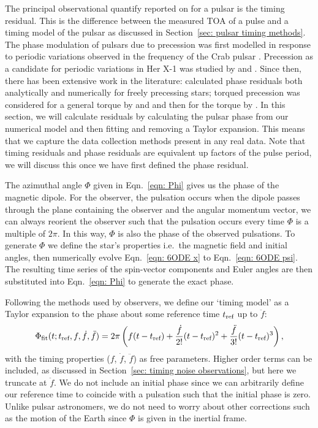 \documentclass[../full_thesis/full_thesis.tex]{subfiles}
\begin{document}
The principal observational quantify reported on for a pulsar is the timing
residual. This is the difference between the measured TOA of a pulse and a
timing model of the pulsar as discussed in Section~\ref{sec: pulsar timing
methods}.  The phase modulation of pulsars due to precession was first modelled
in response to periodic variations observed in the frequency of the Crab pulsar
\citep{Ruderman1970, chiuderi1970shape}. Precession as a candidate for periodic
variations in Her X-1 was studied by \citet{bisnovatyi1990model} and
\citet{bisnovatyi1993period}. Since then, there has been extensive work in the
literature: \citet{Nelson1990} calculated phase residuals both analytically and
numerically for freely precessing stars; torqued precession was considered for
a general torque by \citet{Jones1988excitation} and \citet{Cordes1993} and then
for the \citet{Deutsch1955} torque by \citet{Melatos1999, Melatos2000}.  In
this section, we will calculate residuals by calculating the pulsar phase from
our numerical model and then fitting and removing a Taylor expansion. This
means that we capture the data collection methods present in any real data.
Note that timing residuals and phase residuals are equivalent up factors of the
pulse period, we will discuss this once we have first defined the phase
residual.

The azimuthal angle $\Phi$ given in Eqn.~\eqref{eqn: Phi} gives us the phase of
the magnetic dipole. For the observer, the pulsation occurs when the dipole
passes through the plane containing the observer and the angular momentum
vector,  we can always reorient the observer such that the pulsation occurs
every time $\Phi$ is a multiple of $2\pi$. In this way, $\Phi$ is also the
phase of the observed pulsations. To generate $\Phi$ we define the star's
properties i.e.\ the magnetic field and initial angles, then numerically evolve
Eqn.~\eqref{eqn: 6ODE x} to Eqn.~\eqref{eqn: 6ODE psi}. The resulting time
series of the spin-vector components and Euler angles are then substituted into
Eqn.~\eqref{eqn: Phi} to generate the exact phase.

Following the methods used by observers, we define our `timing model' as
a Taylor expansion to the phase about some reference time $t_{\textrm{ref}}$ up to $\ddot{f}$:
\begin{equation}
    \Phi_{\mathrm{fit}}(t; t_{\textrm{ref}}, f, \dot{f}, \ddot{f}) =
    2\pi \left(f(t - t_{\textrm{ref}}) +
                          \frac{\dot{f}}{2!}(t-t_{\textrm{ref}})^{2} +
                          \frac{\ddot{f}}{3!}(t-t_{\textrm{ref}})^{3}
                          \right),
\label{eqn: TR taylor expansion}
\end{equation}
with the timing properties ($f$, $\dot{f}$, $\ddot{f}$) as free parameters.
Higher order terms can be included, as discussed in Section~\ref{sec: timing noise
observations}, but here we truncate at $\ddot{f}$. We do not include an initial
phase since we can arbitrarily define our reference time to coincide with a
pulsation such that the initial phase is zero.  Unlike pulsar astronomers, we
do not need to worry about other corrections such as the motion of the Earth
since $\Phi$ is given in the inertial frame.
\end{document}

